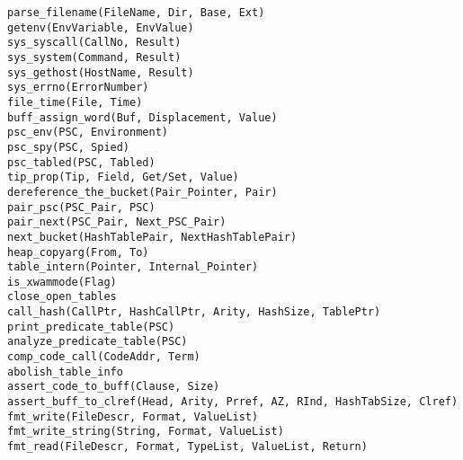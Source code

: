 \begin{tabbing}
 \> {\tt parse\_filename(FileName, Dir, Base, Ext)} \>	\\
 \> {\tt getenv(EnvVariable, EnvValue)}		\>		\\
 \> {\tt sys\_syscall(CallNo, Result)}		\>		\\
 \> {\tt sys\_system(Command, Result)}		\>		\\
 \> {\tt sys\_gethost(HostName, Result)}	\>		\\
 \> {\tt sys\_errno(ErrorNumber)}		\>		\\
 \> {\tt file\_time(File, Time)}		\>		\\
 \> {\tt buff\_assign\_word(Buf, Displacement, Value)}	\>	\\
 \> {\tt psc\_env(PSC, Environment)}		\>		\\
 \> {\tt psc\_spy(PSC, Spied)}			\>		\\
 \> {\tt psc\_tabled(PSC, Tabled)}		\>		\\
 \> {\tt tip\_prop(Tip, Field, Get/Set, Value)}	\>		\\
 \> {\tt dereference\_the\_bucket(Pair\_Pointer, Pair)} \>	\\
 \> {\tt pair\_psc(PSC\_Pair, PSC)}		\>		\\
 \> {\tt pair\_next(PSC\_Pair, Next\_PSC\_Pair)} \>		\\
 \> {\tt next\_bucket(HashTablePair, NextHashTablePair)} \>	\\
 \> {\tt heap\_copyarg(From, To)}		\>              \\
 \> {\tt table\_intern(Pointer, Internal\_Pointer)} \>		\\
 \> {\tt is\_xwammode(Flag)}			\>		\\
 \> {\tt close\_open\_tables}			\>		\\
 \> {\tt call\_hash(CallPtr, HashCallPtr, Arity, HashSize, TablePtr)} \>	\\
 \> {\tt print\_predicate\_table(PSC)}		\>		\\
 \> {\tt analyze\_predicate\_table(PSC)}	\>		\\
 \> {\tt comp\_code\_call(CodeAddr, Term)}	\>		\\
 \> {\tt abolish\_table\_info}			\>		\\
 \> {\tt assert\_code\_to\_buff(Clause, Size)}	\>		\\
 \> {\tt assert\_buff\_to\_clref(Head, Arity, Prref, AZ, RInd, HashTabSize, Clref)}	\>		\\
 \> {\tt fmt\_write(FileDescr, Format, ValueList)}	\>		\\
 \> {\tt fmt\_write\_string(String, Format, ValueList)}	\>		\\
 \> {\tt fmt\_read(FileDescr, Format, TypeList, ValueList, Return)}	\>		\\
\end{tabbing}


